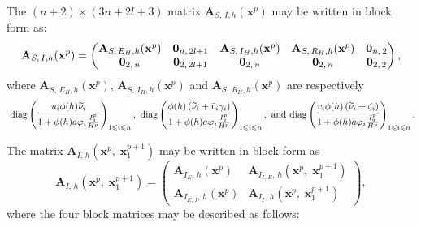 \documentclass[a4paper]{article}
\newcommand{\diag}{\mathrm{diag}}
\newcommand{\miVar}{\varphi_i}
\begin{document}
{\noindent  The $(n+2)\times (3n+2l+3)$ matrix $\mathbf A_{S,\,I,h}(\mathbf x^p)$ may be written in block form as: $$\mathbf A_{S,\,I,h}(\mathbf x^p) = \begin{pmatrix}\mathbf A_{S,\,E_H,h}(\mathbf x^p) &\mathbf 0_{n,\,2l+1} & \mathbf A_{S,\,I_H,h}(\mathbf x^p) & \mathbf A_{S,\,R_H,h}(\mathbf x^p) & \mathbf 0_{n,\,2}\cr \mathbf 0_{2,\,n} & \mathbf 0_{2,\,2l+1} & \mathbf 0_{2,\,n} &  \mathbf 0_{2,\,n} & \mathbf 0_{2,\,2}  \end{pmatrix},$$ 
where $\mathbf A_{S,\,E_H,h}(\mathbf x^p)$, $\mathbf A_{S,\,I_H,h}(\mathbf x^p)$ and $\mathbf A_{S,\,R_H,h}(\mathbf x^p)$ are respectively
$$\ \diag\begin{pmatrix}
	\dfrac{
		u_i\phi(h)\widetilde \nu_i  }{1+ \phi(h)a \miVar  \frac{I^{p}_q}{H^{p}}}
\end{pmatrix}_{1\leqslant i\leqslant n},\  \diag\begin{pmatrix}
\dfrac{
    \phi(h)\left(\widetilde \nu_i + \bar v_i\gamma_i \right) }{1+ \phi(h)a \miVar  \frac{I^{p}_q}{H^{p}}}
\end{pmatrix}_{1\leqslant i\leqslant n}, \hbox{  and  }  \diag\begin{pmatrix}
\dfrac{
	v_i\phi(h) \left(\widetilde \nu_i + \zeta_i \right) }{1+ \phi(h)a \miVar  \frac{I^{p}_q}{H^{p}}}
\end{pmatrix}_{1\leqslant i\leqslant n}.$$
 
 
\noindent The  matrix $\mathbf A_{I,\,h}(\mathbf x^p,\;\mathbf x_1^{p+1})$ may be written in block form  as 
\begin{equation}
\mathbf A_{I,\,h}(\mathbf x^p,\;\mathbf x_1^{p+1}) =    \left(\begin{array}{cc} \mathbf A_{I_E,\,h}(\mathbf x^p)
&   \mathbf A_{I_{I,\,E},\,h}(\mathbf x^p,\;\mathbf x_1^{p+1}) \\ \mathbf A_{I_{E,\,I},\,h}(\mathbf x^p) &  \mathbf
A_{I_I,\,h}(\mathbf x^p,\;\mathbf x_1^{p+1}) \end{array}\right),
\label{eq:matia}
\end{equation}
where the four  block matrices may be described as follows: 
\medskip

}
\end{document}
